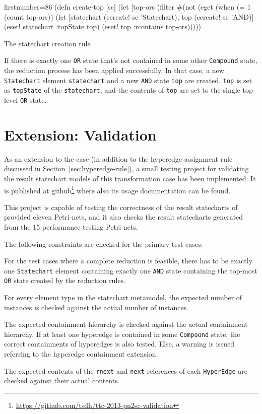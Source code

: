\documentclass[11pt]{article}
\begin{document}
\begin{listing}[H]
  \begin{clojurecode*}{firstnumber=86}
(defn create-top [sc]
  (let [top-ors (filter #(not (eget %
    (when (= 1 (count top-ors))
      (let [statechart (ecreate! sc 'Statechart), top (ecreate! sc 'AND)]
        (eset! statechart :topState top)
        (eset! top :rcontains top-ors)))))
  \end{clojurecode*}
  \label{lst:statechart-rule}
  \caption{The statechart creation rule}
\end{listing}

If there is exactly one \verb|OR| state that's not contained in some other
\verb|Compound| state, the reduction process has been applied successfully.  In
that case, a new \verb|Statechart| element \verb|statechart| and a new
\verb|AND| state \verb|top| are created.  \verb|top| is set as \verb|topState|
of the \verb|statechart|, and the contents of \verb|top| are set to the single
top-level \verb|OR| state.


\section{Extension: Validation}
\label{sec:validation}

As an extension to the case (in addition to the hyperedge assignment rule
discussed in Section~\ref{sec:hyperedge-rule}), a small testing project for
validating the result statechart models of this transformation case has been
implemented.  It is published at
github\footnote{\url{https://github.com/tsdh/ttc-2013-pn2sc-validation}} where
also its usage documentation can be found.

This project is capable of testing the correctness of the result statecharts of
provided eleven Petri-nets, and it also checks the result statecharts generated
from the 15 performance testing Petri-nets.

The following constraints are checked for the primary test cases:

\begin{compactenum}
\item For the test cases where a complete reduction is feasible, there has to
  be exactly one \verb|Statechart| element containing exactly one \verb|AND|
  state containing the top-most \verb|OR| state created by the reduction rules.
\item For every element type in the statechart metamodel, the expected number
  of instances is checked against the actual number of instances.
\item The expected containment hierarchy is checked against the actual
  containment hierarchy.  If at least one hyperedge is contained in some
  \verb|Compound| state, the correct containments of hyperedges is also tested.
  Else, a warning is issued referring to the hyperedge containment extension.
\item The expected contents of the \verb|rnext| and \verb|next| references of
  each \verb|HyperEdge| are checked against their actual contents.
\end{compactenum}
\end{document}
